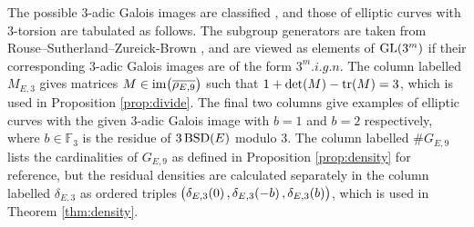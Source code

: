 \documentclass{article}
\theoremstyle{plain}
\theoremstyle{definition}
\newcommand{\BSD}{\operatorname{BSD}}
\newcommand{\FF}{\mathbb{F}}
\newcommand{\GL}{\operatorname{GL}}
\newcommand{\im}{\operatorname{im}}
\newcommand{\tr}{\operatorname{tr}}
\newcommand{\br}{\!\del}
\begin{document}
The possible $ 3 $-adic Galois images are classified \cite[Corollary 1.3.1 and Corollary 12.3.3]{RSZB22}, and those of elliptic curves with $ 3 $-torsion are tabulated as follows. The subgroup generators are taken from Rouse--Sutherland--Zureick-Brown \cite[Software Repository]{RSZB22}, and are viewed as elements of $ \GL\br{3^m} $ if their corresponding $ 3 $-adic Galois images are of the form $ 3^m.i.g.n $. The column labelled $ M_{E, 3} $ gives matrices $ M \in \im\br{\overline{\rho_{E, 9}}} $ such that $ 1 + \det\br{M} - \tr\br{M} = 3 $, which is used in Proposition \ref{prop:divide}. The final two columns give examples of elliptic curves with the given $ 3 $-adic Galois image with $ b = 1 $ and $ b = 2 $ respectively, where $ b \in \FF_3 $ is the residue of $ 3\BSD\br{E} $ modulo $ 3 $. The column labelled $ \#G_{E, 9} $ lists the cardinalities of $ G_{E, 9} $ as defined in Proposition \ref{prop:density} for reference, but the residual densities are calculated separately in the column labelled $ \delta_{E, 3} $ as ordered triples $ \br{\delta_{E, 3}\br{0}, \delta_{E, 3}\br{-b}, \delta_{E, 3}\br{b}} $, which is used in Theorem \ref{thm:density}.

\pagebreak


\vspace{-0.5cm}
\end{document}
